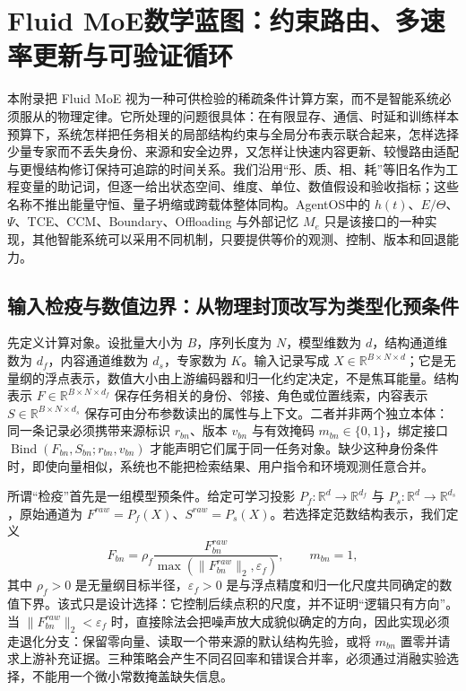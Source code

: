 \chapter{Fluid MoE数学蓝图：约束路由、多速率更新与可验证循环}
\label{chp:fluid_moe_math_blueprint}

本附录把 Fluid MoE 视为一种可供检验的稀疏条件计算方案，而不是智能系统必须服从的物理定律。它所处理的问题很具体：在有限显存、通信、时延和训练样本预算下，系统怎样把任务相关的局部结构约束与全局分布表示联合起来，怎样选择少量专家而不丢失身份、来源和安全边界，又怎样让快速内容更新、较慢路由适配与更慢结构修订保持可追踪的时间关系。我们沿用“形、质、相、耗”等旧名作为工程变量的助记词，但逐一给出状态空间、维度、单位、数值假设和验收指标；这些名称不推出能量守恒、量子坍缩或跨载体整体同构。AgentOS中的 $h(t)$、$E/\Theta$、$\Psi$、TCE、CCM、Boundary、Offloading 与外部记忆 $M_e$ 只是该接口的一种实现，其他智能系统可以采用不同机制，只要提供等价的观测、控制、版本和回退能力。

\section{输入检疫与数值边界：从物理封顶改写为类型化预条件}
\label{sec:appendix_quarantine}

先定义计算对象。设批量大小为 $B$，序列长度为 $N$，模型维数为 $d$，结构通道维数为 $d_f$，内容通道维数为 $d_s$，专家数为 $K$。输入记录写成 $X\in\mathbb{R}^{B\times N\times d}$；它是无量纲的浮点表示，数值大小由上游编码器和归一化约定决定，不是焦耳能量。结构表示 $F\in\mathbb{R}^{B\times N\times d_f}$ 保存任务相关的身份、邻接、角色或位置线索，内容表示 $S\in\mathbb{R}^{B\times N\times d_s}$ 保存可由分布参数读出的属性与上下文。二者并非两个独立本体：同一条记录必须携带来源标识 $r_{bn}$、版本 $v_{bn}$ 与有效掩码 $m_{bn}\in\{0,1\}$，绑定接口 $\operatorname{Bind}(F_{bn},S_{bn};r_{bn},v_{bn})$ 才能声明它们属于同一任务对象。缺少这种身份条件时，即使向量相似，系统也不能把检索结果、用户指令和环境观测任意合并。

所谓“检疫”首先是一组模型预条件。给定可学习投影 $P_f:\mathbb{R}^{d}\to\mathbb{R}^{d_f}$ 与 $P_s:\mathbb{R}^{d}\to\mathbb{R}^{d_s}$，原始通道为 $F^{raw}=P_f(X)$、$S^{raw}=P_s(X)$。若选择定范数结构表示，我们定义
\begin{equation}
F_{bn}=\rho_f\frac{F^{raw}_{bn}}{\max(\lVert F^{raw}_{bn}\rVert_2,\varepsilon_f)},
\qquad m_{bn}=1,
\end{equation}
其中 $\rho_f>0$ 是无量纲目标半径，$\varepsilon_f>0$ 是与浮点精度和归一化尺度共同确定的数值下界。该式只是设计选择：它控制后续点积的尺度，并不证明“逻辑只有方向”。当 $\lVert F^{raw}_{bn}\rVert_2<\varepsilon_f$ 时，直接除法会把噪声放大成貌似确定的方向，因此实现必须走退化分支：保留零向量、读取一个带来源的默认结构先验，或将 $m_{bn}$ 置零并请求上游补充证据。三种策略会产生不同召回率和错误合并率，必须通过消融实验选择，不能用一个微小常数掩盖缺失信息。

